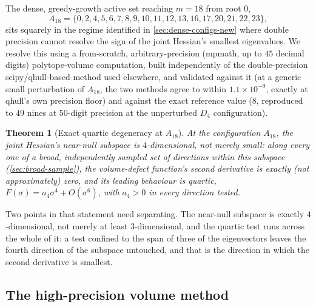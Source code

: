 \documentclass[11pt,reqno]{amsart}
\renewcommand{\_}{\origunderscore\allowbreak}
\numberwithin{equation}{section}
\theoremstyle{plain}
\newtheorem{thm}{Theorem}[section]
\theoremstyle{definition}
\theoremstyle{remark}
\begin{document}
The dense, greedy-growth active set reaching $m=18$ from root $0$,
\[
  A_{18} = \{0,2,4,5,6,7,8,9,10,11,12,13,16,17,20,21,22,23\},
\]
sits squarely in the regime identified in \cref{sec:dense-configs-new}
where double precision cannot resolve the sign of the joint Hessian's
smallest eigenvalues. We resolve this using a from-scratch,
arbitrary-precision (mpmath, up to $45$ decimal digits) polytope-volume
computation, built independently of the double-precision
scipy/qhull-based method used elsewhere, and validated against it (at a
generic small perturbation of $A_{18}$, the two methods agree to within
$1.1\times10^{-9}$, exactly at qhull's own precision floor) and against
the exact reference value ($8$, reproduced to $49$ nines at $50$-digit
precision at the unperturbed $D_4$ configuration).

\begin{thm}[Exact quartic degeneracy at $A_{18}$]\label{thm:exact-sing-new}
At the configuration $A_{18}$, the joint Hessian's near-null subspace is
$4$-dimensional, not merely small: along every one of a broad,
independently sampled set of directions within this subspace
(\cref{sec:broad-sample}), the volume-defect function's second
derivative is exactly (not approximately) zero, and its leading
behaviour is quartic, $F(\sigma)=a_4\sigma^4+O(\sigma^6)$, with $a_4>0$
in every direction tested.
\end{thm}

Two points in that statement need separating. The near-null subspace is
exactly $4$-dimensional, not merely at least $3$-dimensional, and the
quartic test runs across the whole of it: a test confined to the span
of three of the eigenvectors leaves the fourth direction of the
subspace untouched, and that is the direction in which the second
derivative is smallest.

\subsection{The high-precision volume method}\label{sec:hp-volume-method}
\end{document}
